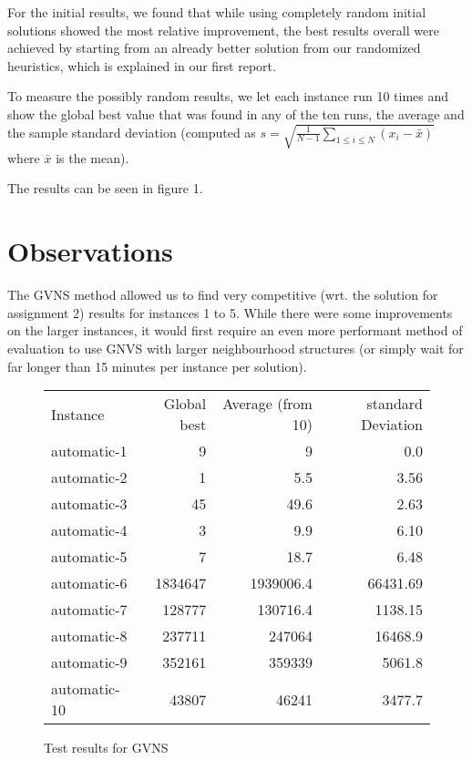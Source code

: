 \documentclass [11pt]{article}
\begin{document}
For the initial results, we found that while using completely random initial solutions showed the most relative improvement, the best results overall were achieved by starting from an already better solution from our randomized heuristics, which is explained in our first report. 

To measure the possibly random results, we let each instance run 10 times and show the global best value that was found in any of the ten runs, the average and the sample standard deviation (computed as $ s = \sqrt{\frac{1}{N - 1} \sum_{1\leq i \leq N}{(x_i - \bar{x})}}$ where $\bar{x}$ is the mean). 

The results can be seen in figure 1.


\section{Observations}
The GVNS method allowed us to find very competitive (wrt. the solution for assignment 2) results for instances 1 to 5. While there were some improvements on the larger instances, it would first require an even more performant method of evaluation to use GNVS with larger neighbourhood structures (or simply wait for far longer than 15 minutes per instance per solution). 

\newpage

\begin{figure}
  \centering
 \label{fig:results}
  \everyrow{\hline}
  \begin{tabu} {| l |r | r |r |}
  Instance        & Global best   & Average (from 10)   & standard Deviation    \\ 
  automatic-1     & 9             & 9                   & 0.0                   \\ 
  automatic-2     & 1             & 5.5                 & 3.56                  \\ 
  automatic-3     & 45            & 49.6                & 2.63                  \\ 
  automatic-4     & 3             & 9.9                 & 6.10                  \\ 
  automatic-5     & 7             & 18.7                & 6.48                  \\ 
  automatic-6     & 1834647       & 1939006.4           & 66431.69              \\ 
  automatic-7     & 128777        & 130716.4            & 1138.15               \\ 
  automatic-8     & 237711        & 247064              & 16468.9               \\ 
  automatic-9     & 352161        & 359339              & 5061.8                \\ 
  automatic-10    & 43807         & 46241               & 3477.7                \\ 
\end{tabu}
\caption{Test results for GVNS} 
\end{figure}
\end{document}
